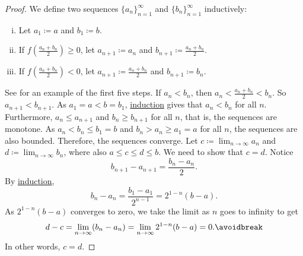 \begin{proof}
We define two sequences $\{ a_n \}_{n=1}^\infty$
and $\{ b_n \}_{n=1}^\infty$ inductively:
\begin{enumerate}[(i)]
\item Let $a_1 \coloneqq a$ and $b_1 \coloneqq b$.
\item If $f\left(\frac{a_n+b_n}{2}\right) \geq 0$, let $a_{n+1} \coloneqq a_n$ and
$b_{n+1} \coloneqq \frac{a_n+b_n}{2}$.
\item If $f\left(\frac{a_n+b_n}{2}\right) < 0$, let $a_{n+1} \coloneqq \frac{a_n+b_n}{2}$ and
$b_{n+1} \coloneqq b_n$.
\end{enumerate}
\begin{myfigureht}
\caption{Finding roots (bisection method).\label{bisectfig}}
\end{myfigureht}
See  for an example of the first five steps.
If $a_n < b_n$, then $a_n < \frac{a_n+b_n}{2} < b_n$.  So
$a_{n+1} < b_{n+1}$.
As $a_1 = a < b = b_1$,
\hyperref[induction:thm]{induction} gives that
$a_n < b_n$ for all $n$.
Furthermore, $a_n \leq a_{n+1}$ and 
$b_n \geq b_{n+1}$ for all $n$, that is, the sequences are monotone.
As $a_n < b_n \leq b_1 = b$ and 
$b_n > a_n \geq a_1 = a$ for all $n$,
the sequences are also bounded.  Therefore, the
sequences converge.
Let $c \coloneqq \lim_{n\to\infty} a_n$ and $d \coloneqq \lim_{n\to\infty} b_n$,
where also $a \leq c \leq d \leq b$.  We need
to show that $c=d$.
Notice
\begin{equation*}
b_{n+1} - a_{n+1} = \frac{b_n-a_n}{2}.
\end{equation*}
By \hyperref[induction:thm]{induction},
\begin{equation*}
b_n - a_n = \frac{b_1-a_1}{2^{n-1}} = 2^{1-n} (b-a) .
\end{equation*}
As $2^{1-n}(b-a)$ converges to zero, we take the limit as $n$ goes to
infinity to get
\begin{equation*}
d-c = \lim_{n\to\infty} (b_n - a_n) =
\lim_{n\to\infty} 2^{1-n} (b-a) = 0.
\avoidbreak
\end{equation*}
In other words, $c=d$.


\end{proof}
